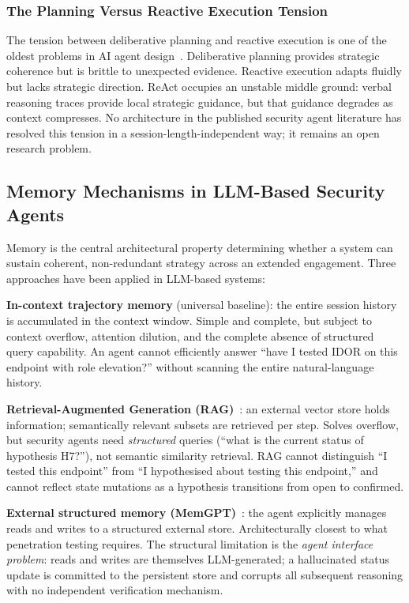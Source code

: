 \documentclass[12pt,a4paper,oneside,openany]{book}
\newcommand{\term}[1]{\textit{#1}}
\begin{document}
\subsubsection{The Planning Versus Reactive Execution Tension}

The tension between deliberative planning and reactive execution is one of the oldest problems in AI agent design~\citep{russell2020ai}. Deliberative planning provides strategic coherence but is brittle to unexpected evidence. Reactive execution adapts fluidly but lacks strategic direction. ReAct occupies an unstable middle ground: verbal reasoning traces provide local strategic guidance, but that guidance degrades as context compresses. No architecture in the published security agent literature has resolved this tension in a session-length-independent way; it remains an open research problem.


\subsection{Memory Mechanisms in LLM-Based Security Agents}
\label{subsec:memory}

Memory is the central architectural property determining whether a system can sustain coherent, non-redundant strategy across an extended engagement. Three approaches have been applied in LLM-based systems:

\textbf{In-context trajectory memory} (universal baseline): the entire session history is accumulated in the context window. Simple and complete, but subject to context overflow, attention dilution, and the complete absence of structured query capability. An agent cannot efficiently answer ``have I tested IDOR on this endpoint with role elevation?'' without scanning the entire natural-language history.

\textbf{Retrieval-Augmented Generation (RAG)}~\citep{lewis2020rag}: an external vector store holds information; semantically relevant subsets are retrieved per step. Solves overflow, but security agents need \textit{structured} queries (``what is the current status of hypothesis H7?''), not semantic similarity retrieval. RAG cannot distinguish ``I tested this endpoint'' from ``I hypothesised about testing this endpoint,'' and cannot reflect state mutations as a hypothesis transitions from open to confirmed.

\textbf{External structured memory (MemGPT)}~\citep{packer2023memgpt}: the agent explicitly manages reads and writes to a structured external store. Architecturally closest to what penetration testing requires. The structural limitation is the \term{agent interface problem}: reads and writes are themselves LLM-generated; a hallucinated status update is committed to the persistent store and corrupts all subsequent reasoning with no independent verification mechanism.
\end{document}
